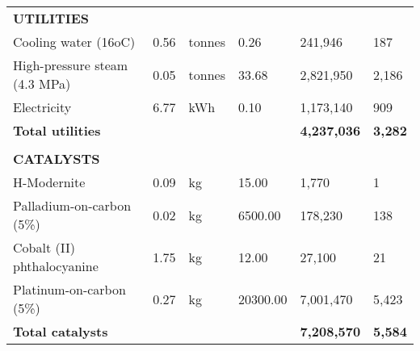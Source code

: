 \begin{table}[H]
\begin{tabular}{llllll}
\textbf{UTILITIES}                      &                       &                                       &                           & \textbf{}                  &                      \\
Cooling water (16oC)                    & 0.56                  & tonnes                                & 0.26                      & 241,946                    & 187                  \\
High-pressure steam (4.3 MPa)           & 0.05                  & tonnes                                & 33.68                     & 2,821,950                  & 2,186                \\
Electricity                             & 6.77                  & kWh                                   & 0.10                      & 1,173,140                  & 909                  \\ \cline{5-6} 
\textbf{Total utilities}                & \textbf{}             & \textbf{}                             & \textbf{}                 & \textbf{4,237,036}         & \textbf{3,282}       \\
                                        &                       &                                       &                           & \textbf{}                  &                      \\
\textbf{CATALYSTS}                      &                       &                                       &                           & \textbf{}                  &                      \\
H-Modernite                             & 0.09                  & kg                                    & 15.00                     & 1,770                      & 1                    \\
Palladium-on-carbon (5\%)               & 0.02                  & kg                                    & 6500.00                   & 178,230                    & 138                  \\
Cobalt (II) phthalocyanine              & 1.75                  & kg                                    & 12.00                     & 27,100                     & 21                   \\
Platinum-on-carbon (5\%)                & 0.27                  & kg                                    & 20300.00                  & 7,001,470                  & 5,423                \\ \cline{5-6} 
\textbf{Total catalysts}                & \textbf{}             & \textbf{}                             & \textbf{}                 & \textbf{7,208,570}         & \textbf{5,584}       \\

\end{tabular}
\end{table}
